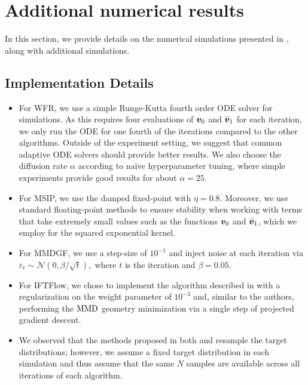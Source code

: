 






\section{Additional numerical results}\label{sec:settings_numerics}
In this section, we provide details on the numerical simulations presented in , along with additional simulations. 

\subsection{Implementation Details}
\begin{itemize}
    \item For WFR, we use a simple Runge-Kutta fourth order ODE solver for simulations. As this requires four evaluations of $\bm{v}_{0}$ and $\bar{\bm{v}}_{1}$ for each iteration, we only run the ODE for one fourth of the iterations compared to the other algorithms. Outside of the experiment setting, we suggest that common adaptive ODE solvers should provide better results. We also choose the diffusion rate $\alpha$ according to na\"{i}ve hyperparameter tuning, where simple experiments provide good results for about $\alpha=25$. 
    \item For MSIP, we use the damped fixed-point with $\eta = 0.8$. Moreover, we use standard floating-point methods to ensure stability when working with terms that take extremely small values such as the functions $\bm{v}_{0}$ and $\bar{\bm{v}}_{1}$, which we employ for the squared exponential kernel.  
    \item For MMDGF, we use a step-size of $10^{-1}$ and inject noise at each iteration via $\varepsilon_t\sim\mathcal{N}(0, \beta/\sqrt{t}),$ where $t$ is the iteration and $\beta=0.05$.
    \item For IFTFlow, we chose to implement the algorithm described in \citet[Appendix A]{GlDvMiZh24} with a regularization on the weight parameter of $10^{-3}$ and, similar to the authors, performing the $\operatorname{MMD}$ geometry minimization via a single step of projected gradient descent.
    \item We observed that the methods proposed in both \citet{ArKoSaGr19} and \citet{GlDvMiZh24} resample the target distributions; however, we assume a fixed target distribution in each simulation and thus assume that the same $N$ samples are available across all iterations of each algorithm.
\end{itemize}

